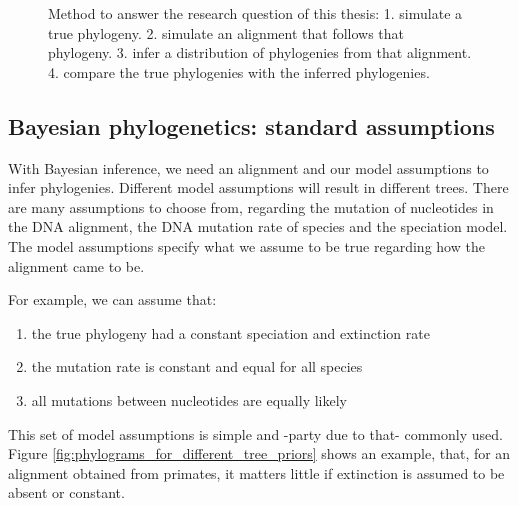 \begin{figure}[H]
{
  }
  \caption{
    Method to answer the research question of this thesis:
    1. simulate a true phylogeny. 
    2. simulate an alignment that follows that phylogeny. 
    3. infer a distribution of phylogenies from that alignment.
    4. compare the true phylogenies with the inferred phylogenies.
  }
  \label{fig:research_workflow}
\end{figure}

\subsection{Bayesian phylogenetics: standard assumptions}

With Bayesian inference, we need an alignment and our model assumptions to
infer phylogenies.
Different model assumptions will result in different trees.
There are many assumptions to choose from, regarding
the mutation of nucleotides in the DNA alignment, the
DNA mutation rate of species and the speciation model.
The model assumptions specify what we assume to be true regarding how
the alignment came to be. 

For example, we can assume that:

\begin{enumerate}[label=\arabic*)]\itemsep2pt
  \item the true phylogeny had a constant speciation and extinction rate 
  \item the mutation rate is constant and equal for all species
  \item all mutations between nucleotides are equally likely
\end{enumerate}

This set of model assumptions is simple and -party due to that-
commonly used. Figure \ref{fig:phylograms_for_different_tree_priors}
shows an example, that, for an alignment obtained from primates, it matters
little if extinction is assumed to be absent or constant.

